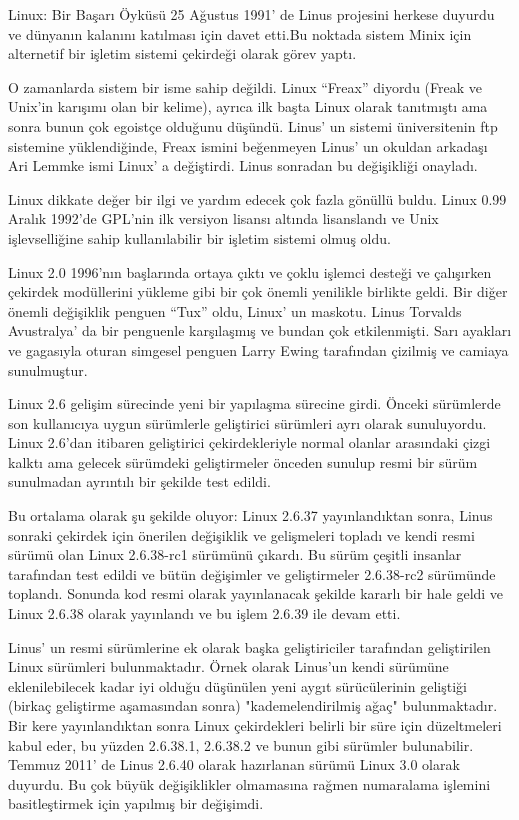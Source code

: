 \begin{section}{Linux: Bir Başarı Öyküsü}
25 Ağustus 1991’ de Linus projesini herkese duyurdu ve dünyanın kalanını katılması için davet etti.Bu noktada sistem Minix için alternetif bir işletim sistemi çekirdeği olarak görev yaptı.

O zamanlarda sistem bir isme sahip değildi. Linux “Freax” diyordu (Freak ve Unix'in karışımı olan bir kelime), ayrıca ilk başta Linux olarak tanıtmıştı ama sonra bunun çok egoistçe olduğunu düşündü. Linus’ un sistemi üniversitenin ftp sistemine yüklendiğinde, Freax ismini beğenmeyen Linus’ un okuldan arkadaşı Ari Lemmke ismi Linux’ a değiştirdi. Linus sonradan bu değişikliği onayladı.

Linux dikkate değer bir ilgi ve yardım edecek çok fazla gönüllü buldu. Linux 0.99 Aralık 1992'de GPL'nin ilk versiyon lisansı altında lisanslandı ve Unix işlevselliğine sahip kullanılabilir bir işletim sistemi olmuş oldu.

Linux 2.0 1996'nın başlarında ortaya çıktı ve çoklu işlemci desteği ve çalışırken çekirdek modüllerini yükleme gibi bir çok önemli yenilikle birlikte geldi. Bir diğer önemli değişiklik penguen “Tux” oldu, Linux’ un maskotu.  Linus Torvalds Avustralya’ da bir penguenle karşılaşmış ve bundan çok etkilenmişti. Sarı ayakları ve gagasıyla oturan simgesel penguen Larry Ewing tarafından çizilmiş ve camiaya sunulmuştur.

Linux 2.6 gelişim sürecinde yeni bir yapılaşma sürecine girdi. Önceki sürümlerde son kullanıcıya uygun sürümlerle geliştirici sürümleri ayrı olarak sunuluyordu. Linux 2.6'dan itibaren geliştirici çekirdekleriyle normal olanlar arasındaki çizgi kalktı ama gelecek sürümdeki geliştirmeler önceden sunulup resmi bir sürüm sunulmadan ayrıntılı bir şekilde test edildi.

Bu ortalama olarak şu şekilde oluyor: Linux 2.6.37 yayınlandıktan sonra, Linus sonraki çekirdek için önerilen değişiklik ve gelişmeleri topladı ve kendi resmi sürümü olan Linux 2.6.38-rc1 sürümünü çıkardı. Bu sürüm çeşitli insanlar tarafından test edildi ve bütün değişimler ve geliştirmeler 2.6.38-rc2 sürümünde toplandı. Sonunda kod resmi olarak yayınlanacak şekilde kararlı bir hale geldi ve Linux 2.6.38 olarak yayınlandı ve bu işlem 2.6.39 ile devam etti.

Linus’ un resmi sürümlerine ek olarak başka geliştiriciler tarafından geliştirilen Linux sürümleri bulunmaktadır. Örnek olarak Linus'un kendi sürümüne eklenilebilecek kadar iyi olduğu düşünülen yeni aygıt sürücülerinin geliştiği (birkaç geliştirme aşamasından sonra) "kademelendirilmiş ağaç" bulunmaktadır. Bir kere yayınlandıktan sonra Linux çekirdekleri belirli bir süre için düzeltmeleri kabul eder, bu yüzden 2.6.38.1, 2.6.38.2 ve bunun gibi sürümler bulunabilir. Temmuz 2011’ de Linus 2.6.40 olarak hazırlanan sürümü Linux 3.0 olarak duyurdu. Bu çok büyük değişiklikler olmamasına rağmen numaralama işlemini basitleştirmek için yapılmış bir değişimdi.


\end{section}

